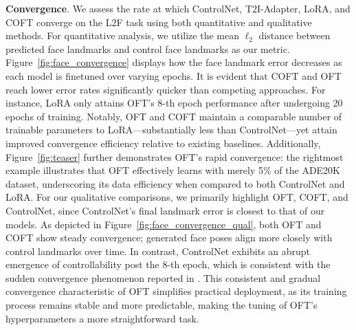 \textbf{Convergence}. We assess the rate at which ControlNet, T2I-Adapter, LoRA, and COFT converge on the L2F task using both quantitative and qualitative methods. For quantitative analysis, we utilize the mean $\ell_2$ distance between predicted face landmarks and control face landmarks as our metric. Figure~\ref{fig:face_convergence} displays how the face landmark error decreases as each model is finetuned over varying epochs. It is evident that COFT and OFT reach lower error rates significantly quicker than competing approaches. For instance, LoRA only attains OFT’s 8-th epoch performance after undergoing 20 epochs of training. Notably, OFT and COFT maintain a comparable number of trainable parameters to LoRA—substantially less than ControlNet—yet attain improved convergence efficiency relative to existing baselines. Additionally, Figure~\ref{fig:teaser} further demonstrates OFT’s rapid convergence: the rightmost example illustrates that OFT effectively learns with merely 5\% of the ADE20K dataset, underscoring its data efficiency when compared to both ControlNet and LoRA. For our qualitative comparisons, we primarily highlight OFT, COFT, and ControlNet, since ControlNet’s final landmark error is closest to that of our models. As depicted in Figure~\ref{fig:face_convergence_qual}, both OFT and COFT show steady convergence; generated face poses align more closely with control landmarks over time. In contrast, ControlNet exhibits an abrupt emergence of controllability post the 8-th epoch, which is consistent with the sudden convergence phenomenon reported in \cite{zhang2023adding}. This consistent and gradual convergence characteristic of OFT simplifies practical deployment, as its training process remains stable and more predictable, making the tuning of OFT’s hyperparameters a more straightforward task.

